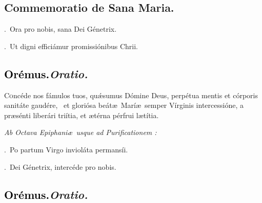 \documentclass[12pt]{article} %
\newenvironment{rubric}{\vspace{1 mm}\color{benred8} \itshape \leftskip 0in \setlength{\parindent}{0.25in}}{\vspace{1 mm}}
\newenvironment{response}{\leftskip 0in \setlength{\parindent}{0in}}{\vspace{1 mm}}
\let\oldgresixstar\gresixstar
\renewcommand{\gresixstar}{\textcolor{benred8}{\oldgresixstar}}
\let\oldVbar\Vbar
\renewcommand{\Vbar}{\textcolor{benred8}{\oldVbar .}}
\let\oldRbar\Rbar
\renewcommand{\Rbar}{\textcolor{benred8}{\oldRbar .}}
\def\capitulumSpace{\hspace{20 mm}}
\begin{document}

\subsection*{Commemoratio de Sana Maria.}


\gresetfirstlineaboveinitial{\small \textsc{ \textbf{\textcolor{benred8}{I}}}}{\small \textsc{ \textbf{\textcolor{benred8}{I}}}}

\begin{response}
\Vbar\ Ora pro nobis, sana Dei G\'{e}netrix.

\Rbar\ Ut digni effici\'{a}mur promissi\'{o}nibus Chrii.

\end{response}

\subsection*{\textcolor{black}{Or\'{e}mus.}\capitulumSpace \emph{Oratio.}}

\begin{response}\lettrine{C}{o}nc\'{e}de nos f\'{a}mulos tuos, qu\'{\ae}sumus D\'{o}mine Deus, perp\'{e}tua mentis et c\'{o}rporis sanit\'{a}te gaud\'{e}re, \gresixstar\ et glori\'{o}sa be\'{a}t\ae\ Mar\'{i}\ae\ semper V\'{i}rginis intercessi\'{o}ne, a pr\ae s\'{e}nti liber\'{a}ri tri\'{i}tia, et \ae t\'{e}rna p\'{e}rfrui l\ae t\'{i}tia.

\end{response}

\begin{rubric}
Ab Octava Epiphani\ae\ usque ad Purificationem :

\end{rubric}

\begin{response}
\Vbar\ Po partum Virgo inviol\'{a}ta permans\'{i}i.

\Rbar\ Dei G\'{e}netrix, interc\'{e}de pro nobis.

\end{response}

\subsection*{\textcolor{black}{Or\'{e}mus.}\capitulumSpace \emph{Oratio.}}
\end{document}
